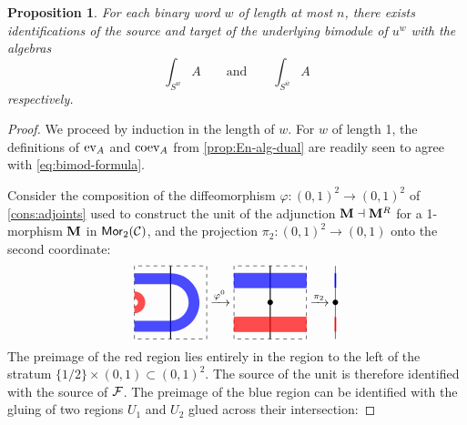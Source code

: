 \documentclass[10pt, reqno, twoside
, final
]{amsart}
\numberwithin{equation}{subsection}%
\theoremstyle{definition}
\theoremstyle{definition}
\theoremstyle{definition}
\theoremstyle{definition}
\theoremstyle{definition}
\theoremstyle{definition}
\theoremstyle{definition}
\theoremstyle{definition}
\theoremstyle{definition}
\theoremstyle{plain}
\theoremstyle{definition}
\theoremstyle{plain}
\theoremstyle{definition}
\theoremstyle{plain}
\theoremstyle{definition}
\theoremstyle{definition}
\theoremstyle{plain}
\theoremstyle{plain}
\theoremstyle{definition}
\theoremstyle{plain}
\theoremstyle{plain}
\newtheorem{prop}[defn]{Proposition}
\theoremstyle{plain}
\begin{document}
\begin{prop}\label{prop:bimod-formula}
For each binary word $w$ of length at most $n$, there exists identifications of the source and target of the underlying bimodule of $u^w$ with the algebras
\begin{equation}
    \int_{S^{w}} A \qquad \text{and} \qquad {\int_{S^{\overline{w}} } A}\label{eq:bimod-formula}
\end{equation}
respectively.
\end{prop}

\begin{proof}
We proceed by induction in the length of $w$. For $w$ of length 1, the definitions of $\mathrm{ev}_A$ and $\mathrm{coev}_A$ from \cref{prop:En-alg-dual} are readily seen to agree with \eqref{eq:bimod-formula}. 

Consider the composition of the diffeomorphism $\varphi:(0,1)^2\to (0,1)^2$ of \ref{cons:adjoints} used to construct the unit of the adjunction $\mathbf{M} \dashv \mathbf{M}^{R}$ for a 1-morphism $\mathbf{M}$ in $\mathsf{Mor}_2(\mathcal{C})$, and the projection $\pi_2:(0,1)^2 \to(0,1)$ onto the second coordinate:
\begin{equation*}
\begin{tikzpicture}[baseline=0.9cm]
    \draw[dashed] (0,0) rectangle (2,2);
    \draw[thick] (1,2) -- (1,0);
    \fill[blue,opacity=0.7] (0,0.2) -- (1,0.2) arc[start angle = -90, end angle = 90,radius = 0.8]  
    -- (0,1.8) -- (0,1.5) -- (1,1.5) arc[start angle = 90, end angle = -90,radius = 0.5] 
    -- (0,0.5) -- (0,0.2);
    \fill[red,opacity=0.7] (0,0.7) arc[start angle = -90, end angle = 90,radius = 0.3]  
    -- (0,1.1)  arc[start angle = 90, end angle = -90,radius = 0.1]  -- (0,0.7) ;
\end{tikzpicture}
\xrightarrow{\varphi^0}
\begin{tikzpicture}[baseline=0.9cm]
    \draw[dashed] (0,0) rectangle (2,2);
    \draw[thick] (1,2) -- (1,0);
    \node[fill,circle,inner sep=1.5pt] at (1,1) {};
    \filldraw[red,opacity=0.7] (0,0.2) rectangle (2,0.6);
    \filldraw[blue,opacity=0.7] (0,1.4) rectangle (2,1.8);
\end{tikzpicture}
\xrightarrow{\pi_2}
\begin{tikzpicture}[baseline=0.9cm]
    \draw (1,2) -- (1,0);
    \node[fill,circle,inner sep=1.5pt] at (1,1) {};
    \draw[red,very thick] (1,0.2) -- (1,0.6);
    \draw[blue,very thick] (1,1.4) -- (1,1.8);
\end{tikzpicture}
\end{equation*}
The preimage of the red region lies entirely in the region to the left of the stratum $\{1/2\}\times (0,1)\subset (0,1)^2$. The source of the unit is therefore identified with the source of $\mathcal{F}$. The preimage of the blue region can be identified with the gluing of two regions $U_1$ and $U_2$ glued across their intersection:

\end{proof}
\end{document}
